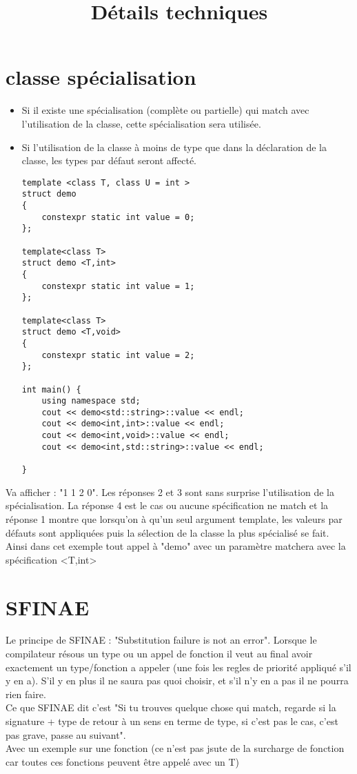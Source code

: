 \documentclass[a4paper, 11pt]{article}
\begin{document}
	\title{Détails techniques}
	\maketitle
	\tableofcontents
 	
\section{classe spécialisation}

\begin{itemize}
	\item Si il existe une spécialisation (complète ou partielle) qui match avec l'utilisation de la classe, cette spécialisation sera utilisée. 
	\item Si l'utilisation de la classe à moins de type que dans la déclaration de la classe, les types par défaut seront affecté.
	\begin{lstlisting}
template <class T, class U = int >
struct demo
{
    constexpr static int value = 0;
};

template<class T>
struct demo <T,int>
{
    constexpr static int value = 1;
};

template<class T>
struct demo <T,void>
{
    constexpr static int value = 2;
};

int main() {
    using namespace std;
    cout << demo<std::string>::value << endl;
    cout << demo<int,int>::value << endl;
    cout << demo<int,void>::value << endl;
    cout << demo<int,std::string>::value << endl;

}
	\end{lstlisting}
\end{itemize}
Va afficher : "1 1 2 0". Les réponses 2 et 3 sont sans surprise l'utilisation de la spécialisation. La réponse 4 est le cas ou aucune spécification ne match et la réponse 1 montre que lorsqu'on à qu'un seul argument template, les valeurs par défauts sont appliquées puis la sélection de la classe la plus spécialisé se fait. Ainsi dans cet exemple tout appel à "demo" avec un paramètre matchera avec la spécification <T,int>

\section{SFINAE}

Le principe de SFINAE : "Substitution failure is not an error".
Lorsque le compilateur résous un type ou un appel de fonction il veut au final avoir exactement un type/fonction a appeler (une fois les regles de priorité appliqué s'il y en a). S'il y en plus il ne saura pas quoi choisir, et s'il n'y en a pas il ne pourra rien faire. \\
Ce que SFINAE dit c'est "Si tu trouves quelque chose qui match, regarde si la signature + type de retour à un sens en terme de type, si c'est pas le cas, c'est pas grave, passe au suivant". 
\\Avec un exemple sur une fonction (ce n'est pas jsute de la surcharge de fonction car toutes ces fonctions peuvent être appelé avec un T)
\end{document}
